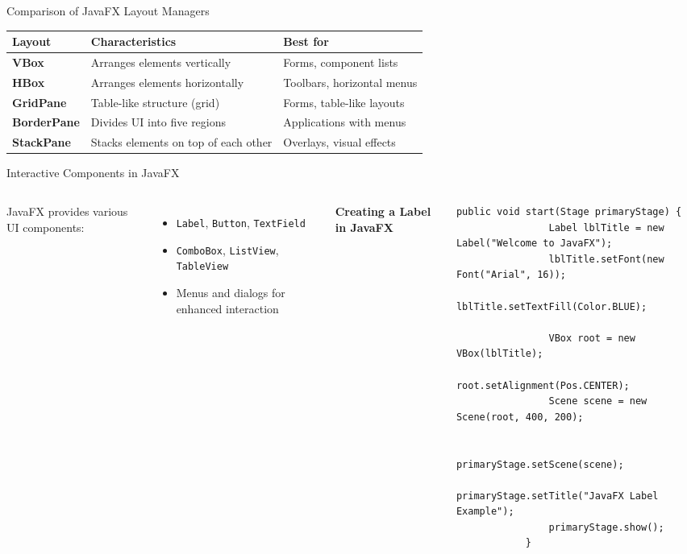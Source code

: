 \documentclass[aspectratio=169, table]{beamer}
\begin{document}
\begin{frame}[fragile]{Comparison of JavaFX Layout Managers}
	\vspace{20pt}
	\begin{table}[h]
		\centering
		\renewcommand{\arraystretch}{1.2} %
		\begin{tabular}{|p{3cm}|p{5cm}|p{4cm}|}
			\hline
			\rowcolor{gray!20} \textbf{Layout} & \textbf{Characteristics} & \textbf{Best for} \\
			\hline
			\textbf{VBox} & Arranges elements vertically & Forms, component lists \\
			\hline
			\textbf{HBox} & Arranges elements horizontally & Toolbars, horizontal menus \\
			\hline
			\textbf{GridPane} & Table-like structure (grid) & Forms, table-like layouts \\
			\hline
			\textbf{BorderPane} & Divides UI into five regions & Applications with menus \\
			\hline
			\textbf{StackPane} & Stacks elements on top of each other & Overlays, visual effects \\
			\hline
		\end{tabular}
	\end{table}
\end{frame}


\begin{frame}[fragile]{Interactive Components in JavaFX}
	\vspace{20pt}
	\begin{columns}[t]
		JavaFX provides various UI components:
		\begin{itemize}
			\item \texttt{Label}, \texttt{Button}, \texttt{TextField}
			\item \texttt{ComboBox}, \texttt{ListView}, \texttt{TableView}
			\item Menus and dialogs for enhanced interaction
		\end{itemize}
		
		\textbf{Creating a Label in JavaFX}
		\begin{lstlisting}[style=JavaStyle]
			public void start(Stage primaryStage) {
				Label lblTitle = new Label("Welcome to JavaFX");
				lblTitle.setFont(new Font("Arial", 16));
				lblTitle.setTextFill(Color.BLUE);
				
				VBox root = new VBox(lblTitle);
				root.setAlignment(Pos.CENTER);
				Scene scene = new Scene(root, 400, 200);
				
				primaryStage.setScene(scene);
				primaryStage.setTitle("JavaFX Label Example");
				primaryStage.show();
			}
		\end{lstlisting}
	\end{columns}
\end{frame}
\end{document}
